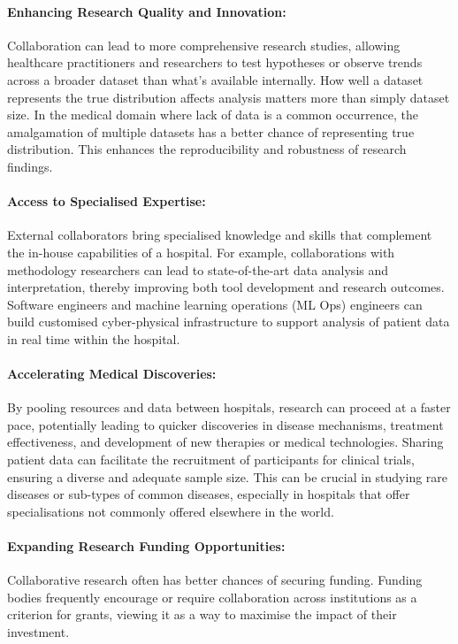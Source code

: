 \documentclass[11pt]{article}
\begin{document}
\paragraph{Enhancing Research Quality and Innovation:} 
Collaboration can lead to more comprehensive research studies, allowing healthcare practitioners and researchers to test hypotheses or observe trends across a broader dataset than what's available internally. How well a dataset represents the true distribution affects analysis matters more than simply dataset size\cite{app11020796}. In the medical domain where lack of data is a common occurrence, the amalgamation of multiple datasets has a better chance of representing true distribution. This enhances the reproducibility and robustness of research findings.

\paragraph{Access to Specialised Expertise:} 
External collaborators bring specialised knowledge and skills that complement the in-house capabilities of a hospital. For example, collaborations with methodology researchers can lead to state-of-the-art data analysis and interpretation, thereby improving both tool development and research outcomes. Software engineers and machine learning operations (ML Ops) engineers can build customised cyber-physical infrastructure to support analysis of patient data in real time within the hospital\cite{harris2022}.

\paragraph{Accelerating Medical Discoveries:}
By pooling resources and data between hospitals, research can proceed at a faster pace\cite{app11020796}, potentially leading to quicker discoveries in disease mechanisms, treatment effectiveness, and development of new therapies or medical technologies. Sharing patient data can facilitate the recruitment of participants for clinical trials, ensuring a diverse and adequate sample size. This can be crucial in studying rare diseases or sub-types of common diseases, especially in hospitals that offer specialisations not commonly offered elsewhere in the world. 

\paragraph{Expanding Research Funding Opportunities:} Collaborative research often has better chances of securing funding\cite{Vasan2021}. Funding bodies frequently encourage or require collaboration across institutions as a criterion for grants, viewing it as a way to maximise the impact of their investment.
\end{document}
